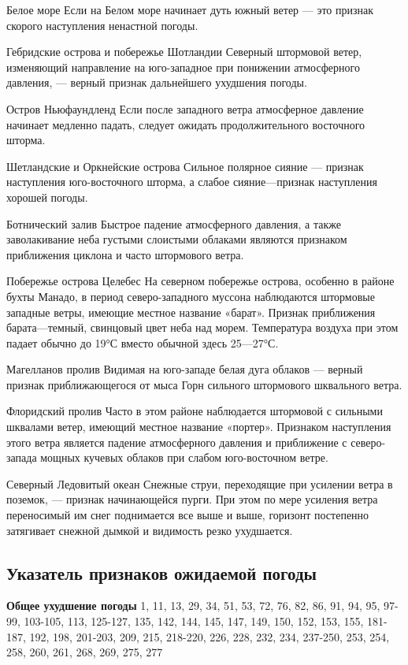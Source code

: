 Белое море
Если на Белом море начинает дуть южный ветер — это признак скорого наступления ненастной погоды.

Гебридские острова и побережье Шотландии
Северный штормовой ветер, изменяющий направление на юго-западное при понижении атмосферного давления, — верный признак дальнейшего ухудшения погоды.

Остров Ньюфаундленд
Если после западного ветра атмосферное давление начинает медленно падать, следует ожидать продолжительного восточного шторма.

Шетландские и Оркнейские острова
Сильное полярное сияние — признак наступления юго-восточного шторма, а слабое сияние—признак наступления хорошей погоды.

Ботнический залив
Быстрое падение атмосферного давления, а также заволакивание неба густыми слоистыми облаками являются признаком приближения циклона и часто штормового ветра.

Побережье острова Целебес
На северном побережье острова, особенно в районе бухты Манадо, в период северо-западного муссона наблюдаются штормовые западные ветры, имеющие местное название «барат». Признак приближения барата—темный, свинцовый цвет неба над морем. Температура воздуха при этом падает обычно до 19°С вместо обычной здесь 25—27°С.

Магелланов пролив
Видимая на юго-западе белая дуга облаков — верный признак приближающегося от мыса Горн сильного штормового шквального ветра.

Флоридский пролив
Часто в этом районе наблюдается штормовой с сильными шквалами ветер, имеющий местное название «портер». Признаком наступления этого ветра является падение атмосферного давления и приближение с северо-запада мощных кучевых облаков при слабом юго-восточном ветре.

Северный Ледовитый океан
Снежные струи, переходящие при усилении ветра в поземок, — признак начинающейся пурги. При этом по мере усиления ветра переносимый им снег поднимается все выше и выше, горизонт постепенно затягивает снежной дымкой и видимость резко ухудшается.

\subsection{Указатель признаков ожидаемой погоды}
\textbf{Общее ухудшение погоды} 1, 11, 13, 29, 34, 51, 53, 72, 76, 82, 86, 91, 94, 95, 97-99, 103-105, 113, 125-127, 135, 142, 144, 145, 147, 149, 150, 152, 153, 155, 181-187, 192, 198, 201-203, 209, 215, 218-220, 226, 228, 232, 234, 237-250, 253, 254, 258, 260, 261, 268, 269, 275, 277


